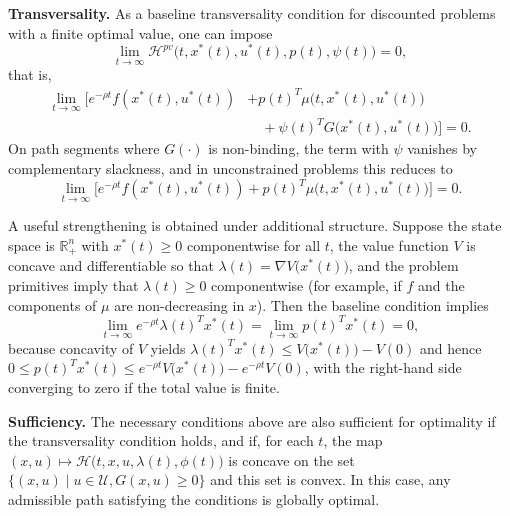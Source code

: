 \documentclass[../../lecture_notes.tex]{subfiles}
\begin{document}
\medskip

\textbf{Transversality.} As a baseline transversality condition for discounted problems with a finite optimal value, one can impose
\begin{equation*}
  \lim_{t\to\infty}\mathcal{H}^{pv}\bigl(t,x^{\ast}(t),u^{\ast}(t),p(t),\psi(t)\bigr)=0,
\end{equation*}
that is,
\begin{align*}
  \lim_{t\to\infty}\bigl[e^{-\rho t}f(x^{\ast}(t),u^{\ast}(t))&+p(t)^{T}\mu\bigl(t,x^{\ast}(t),u^{\ast}(t)\bigr)\\
  &\quad+\psi(t)^{T}G\bigl(x^{\ast}(t),u^{\ast}(t)\bigr)\bigr]=0.
\end{align*}
On path segments where \(G(\cdot)\) is non-binding, the term with \(\psi\) vanishes by complementary slackness, and in unconstrained problems this reduces to
\begin{equation*}
  \lim_{t\to\infty}\bigl[e^{-\rho t}f(x^{\ast}(t),u^{\ast}(t))+p(t)^{T}\mu\bigl(t,x^{\ast}(t),u^{\ast}(t)\bigr)\bigr]=0.
\end{equation*}

A useful strengthening is obtained under additional structure.
Suppose the state space is \(\mathbb{R}_{+}^{n}\) with \(x^{\ast}(t)\ge 0\) componentwise for all \(t\), the value function \(V\) is concave and differentiable so that \(\lambda(t)=\nabla V\bigl(x^{\ast}(t)\bigr)\), and the problem primitives imply that \(\lambda(t)\ge 0\) componentwise (for example, if \(f\) and the components of \(\mu\) are non-decreasing in \(x\)).
Then the baseline condition implies
\begin{equation*}
  \lim_{t\to\infty} e^{-\rho t}\lambda(t)^{T}x^{\ast}(t)=\lim_{t\to\infty} p(t)^{T}x^{\ast}(t)=0,
\end{equation*}
because concavity of \(V\) yields \(\lambda(t)^{T}x^{\ast}(t)\le V\bigl(x^{\ast}(t)\bigr)-V(0)\) and hence \(0\le p(t)^{T}x^{\ast}(t)\le e^{-\rho t}V\bigl(x^{\ast}(t)\bigr)-e^{-\rho t}V(0)\), with the right-hand side converging to zero if the total value is finite.

\medskip

\textbf{Sufficiency.} The necessary conditions above are also sufficient for optimality if the transversality condition holds, and if, for each \(t\), the map \((x,u)\mapsto \mathcal{H}\bigl(t,x,u,\lambda(t),\phi(t)\bigr)\) is concave on the set \(\{(x,u) \mid u \in \mathcal{U}, G(x,u) \ge 0\}\) and this set is convex.
In this case, any admissible path satisfying the conditions is globally optimal.
\end{document}

